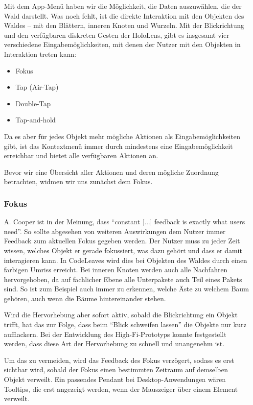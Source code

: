 Mit dem App-Menü haben wir die Möglichkeit, die Daten auszuwählen, die der Wald darstellt. Was noch fehlt, ist die direkte Interaktion mit den Objekten des Waldes -- mit den Blättern, inneren Knoten und Wurzeln. Mit der Blickrichtung und den verfügbaren diskreten Gesten der HoloLens, gibt es insgesamt vier verschiedene Eingabemöglichkeiten, mit denen der Nutzer mit den Objekten in Interaktion treten kann:

\begin{itemize}
  \item Fokus
  \item Tap (Air-Tap)
  \item Double-Tap
  \item Tap-and-hold
\end{itemize}

Da es aber für jedes Objekt mehr mögliche Aktionen als Eingabemöglichkeiten gibt, ist das Kontextmenü immer durch mindestens eine Eingabemöglichkeit erreichbar und bietet alle verfügbaren Aktionen an.

Bevor wir eine Übersicht aller Aktionen und deren mögliche Zuordnung betrachten, widmen wir uns zunächst dem Fokus.

\subsubsection*{Fokus}

A. Cooper ist in \cite{cooper2014face} der Meinung, dass ``constant [...] feedback is exactly what users need''. So sollte abgesehen von weiteren Auswirkungen dem Nutzer immer Feedback zum aktuellen Fokus gegeben werden. Der Nutzer muss zu jeder Zeit wissen, welches Objekt er gerade fokussiert, was dazu gehört und dass er damit interagieren kann. In CodeLeaves wird dies bei Objekten des Waldes durch einen farbigen Umriss erreicht. Bei inneren Knoten werden auch alle Nachfahren hervorgehoben, da auf fachlicher Ebene alle Unterpakete auch Teil eines Pakets sind. So ist zum Beispiel auch immer zu erkennen, welche Äste zu welchem Baum gehören, auch wenn die Bäume hintereinander stehen.

Wird die Hervorhebung aber sofort aktiv, sobald die Blickrichtung ein Objekt trifft, hat das zur Folge, dass beim "`Blick schweifen lassen"' die Objekte nur kurz aufflackern. Bei der Entwicklung des High-Fi-Prototyps konnte festgestellt werden, dass diese Art der Hervorhebung zu schnell und unangenehm ist.

Um das zu vermeiden, wird das Feedback des Fokus verzögert, sodass es erst sichtbar wird, sobald der Fokus einen bestimmten Zeitraum auf demselben Objekt verweilt. Ein passendes Pendant bei Desktop-Anwendungen wären Tooltips, die erst angezeigt werden, wenn der Mauszeiger über einem Element verweilt.

